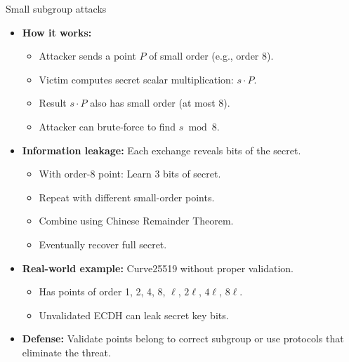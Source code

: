 \documentclass[aspectratio=169, lualatex, handout]{beamer}
\begin{document}
\begin{frame}{Small subgroup attacks}
	\begin{itemize}[<+->]
		\item \textbf{How it works:}
		      \begin{itemize}
			      \item Attacker sends a point $P$ of small order (e.g., order 8).
			      \item Victim computes secret scalar multiplication: $s \cdot P$.
			      \item Result $s \cdot P$ also has small order (at most 8).
			      \item Attacker can brute-force to find $s \bmod 8$.
		      \end{itemize}
		\item \textbf{Information leakage:} Each exchange reveals bits of the secret.
		      \begin{itemize}
			      \item With order-8 point: Learn 3 bits of secret.
			      \item Repeat with different small-order points.
			      \item Combine using Chinese Remainder Theorem.
			      \item Eventually recover full secret.
		      \end{itemize}
		\item \textbf{Real-world example:} Curve25519 without proper validation.
		      \begin{itemize}
			      \item Has points of order 1, 2, 4, 8, $\ell$, $2\ell$, $4\ell$, $8\ell$.
			      \item Unvalidated ECDH can leak secret key bits.
		      \end{itemize}
		\item \textbf{Defense:} Validate points belong to correct subgroup or use protocols that eliminate the threat.
	\end{itemize}
\end{frame}
\end{document}
